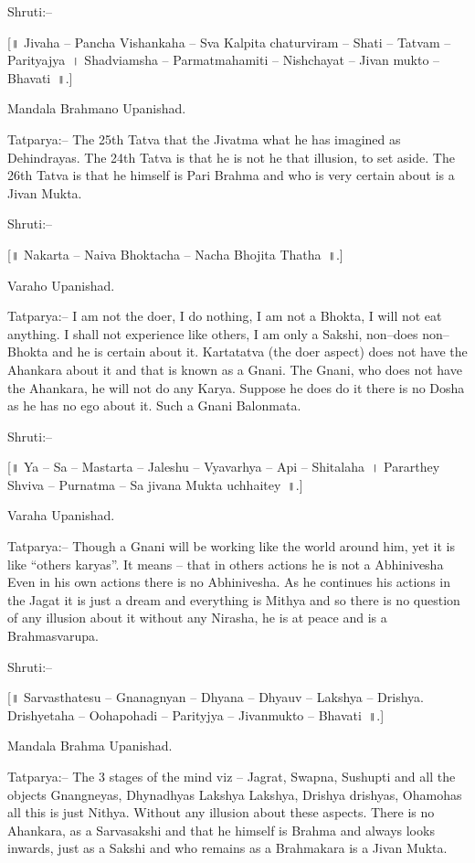 Shruti:–

[॥ Jivaha – Pancha Vishankaha – Sva Kalpita chaturviram – Shati – Tatvam – Parityajya~। Shadviamsha – Parmatmahamiti – Nishchayat – Jivan mukto – Bhavati~॥.]

Mandala Brahmano Upanishad.

Tatparya:– The 25th Tatva that the Jivatma what he has imagined as Dehindrayas. The 24th Tatva is that he is not he that illusion, to set aside. The 26th Tatva is that he himself is Pari Brahma and who is very certain about is a Jivan Mukta.

Shruti:–

[॥ Nakarta – Naiva Bhoktacha – Nacha Bhojita Thatha~॥.]

Varaho Upanishad.

Tatparya:– I am not the doer, I do nothing, I am not a Bhokta, I will not eat anything. I shall not experience like others, I am only a Sakshi, non–does non–Bhokta and he is certain about it. Kartatatva (the doer aspect) does not have the Ahankara about it and that is known as a Gnani. The Gnani, who does not have the Ahankara, he will not do any Karya. Suppose he does do it there is no Dosha as he has no ego about it. Such a Gnani Balonmata.

Shruti:–

[॥ Ya – Sa – Mastarta – Jaleshu – Vyavarhya – Api – Shitalaha~। Pararthey Shviva – Purnatma – Sa jivana Mukta uchhaitey~॥.]

Varaha Upanishad.

Tatparya:– Though a Gnani will be working like the world around him, yet it is like “others karyas”. It means – that in others actions he is not a Abhinivesha Even in his own actions there is no Abhinivesha. As he continues his actions in the Jagat it is just a dream and everything is Mithya and so there is no question of any illusion about it without any Nirasha, he is at peace and is a Brahmasvarupa.

Shruti:–

[॥ Sarvasthatesu – Gnanagnyan – Dhyana – Dhyauv – Lakshya – Drishya. Drishyetaha – Oohapohadi – Parityjya – Jivanmukto – Bhavati~॥.]

Mandala Brahma Upanishad.

Tatparya:– The 3 stages of the mind viz – Jagrat, Swapna, Sushupti and all the objects Gnangneyas, Dhynadhyas Lakshya Lakshya, Drishya drishyas, Ohamohas all this is just Nithya. Without any illusion about these aspects. There is no Ahankara, as a Sarvasakshi and that he himself is Brahma and always looks inwards, just as a Sakshi and who remains as a Brahmakara is a Jivan Mukta.

